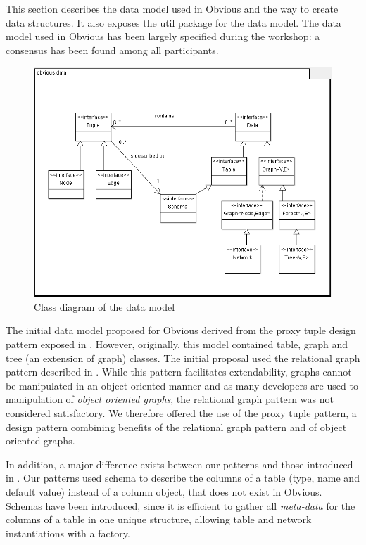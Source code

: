This section describes the data model used in Obvious and the way to
create data structures. It also exposes the util package for the data
model.  The data model used in Obvious has been largely specified
during the workshop: a consensus has been found among all
participants.

\begin{figure}
\includegraphics[width=\columnwidth]{figures/obviousdataclass}
\caption{Class diagram of the data model}
\label{fig:datamodel}
\end{figure}

The initial data model proposed for Obvious derived from the proxy tuple
design pattern exposed in \cite{DesignPatternsIV}. However, originally, this model
contained table, graph and tree (an extension of graph) classes. The initial proposal
used the relational graph pattern described in \cite{DesignPatternsIV}. 
While this pattern facilitates extendability, graphs cannot be manipulated in an
object-oriented manner and as many developers are used to manipulation of
 \emph{object oriented graphs}, the relational graph pattern was not considered
 satisfactory.  We therefore offered the use of the proxy tuple pattern, a
design pattern combining benefits of the relational graph pattern and
of object oriented graphs.

In addition, a major difference exists between our patterns and those
introduced in \cite{DesignPatternsIV}. Our patterns used schema to describe
the columns of a table (type, name and default value) instead of a column object,
that does not exist in Obvious. Schemas have been introduced, since it
is efficient to gather all \emph{meta-data} for the columns of a
table in one unique structure, allowing table and network instantiations
with a factory.

